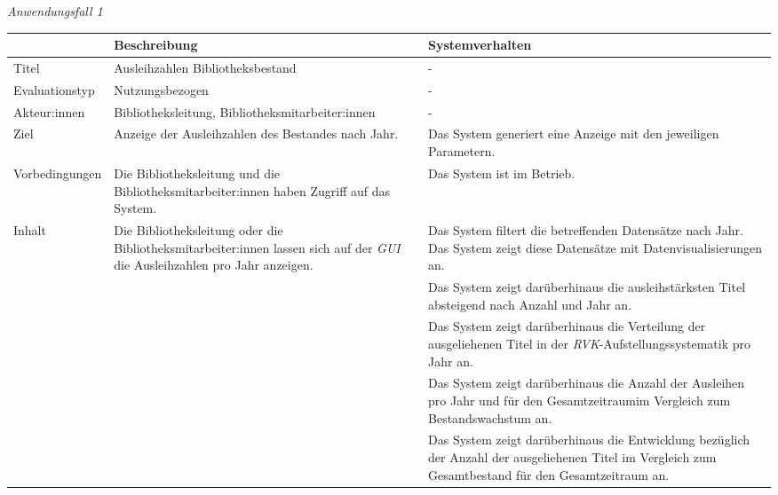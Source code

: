 \noindent
\textit{Anwendungsfall 1}
\begingroup
\setlength{\tabcolsep}{10pt} %
\renewcommand{\arraystretch}{1.25} 
\begin{table}[h]
    \centering
    \begin{adjustbox}{max width=\textwidth}
    \begin{tabular}{lp{7.5cm}p{7.5cm}}
       \toprule
       \textbf{}          & \textbf{Beschreibung} &\textbf{Systemverhalten}\\
       \midrule
        Titel                            &Ausleihzahlen Bibliotheksbestand  & -\\
        Evaluationstyp                   &Nutzungsbezogen                   & -\\
        Akteur:innen                     &Bibliotheksleitung, Bibliotheksmitarbeiter:innen & -\\
        Ziel                             &Anzeige der Ausleihzahlen des Bestandes nach Jahr. & Das System generiert eine Anzeige mit den jeweiligen Parametern.\\
        Vorbedingungen                   &Die Bibliotheksleitung und die Bibliotheksmitarbeiter:innen haben Zugriff auf das System. & Das System ist im Betrieb.\\
        Inhalt                           &Die Bibliotheksleitung oder die Bibliotheksmitarbeiter:innen lassen sich auf der \textit{\acrshort{GUI}} die Ausleihzahlen pro Jahr anzeigen. & Das System filtert die betreffenden Datensätze nach Jahr. Das System zeigt diese Datensätze mit Datenvisualisierungen an.\\
                                         & &Das System zeigt darüberhinaus die ausleihstärksten Titel absteigend nach Anzahl und Jahr an.\\
                                         & &Das System zeigt darüberhinaus die Verteilung der ausgeliehenen Titel in der \textit{\acrshort{RVK}}-Aufstellungssystematik pro Jahr an.\\
                                         & &Das System zeigt darüberhinaus die Anzahl der Ausleihen pro Jahr und für den Gesamtzeitraum\footnotemark im Vergleich zum Bestandswachstum an.\\
                                         & &Das System zeigt darüberhinaus die Entwicklung bezüglich der Anzahl der ausgeliehenen Titel im Vergleich zum Gesamtbestand für den Gesamtzeitraum an.\\


\end{tabular}
\end{adjustbox}
\end{table}
